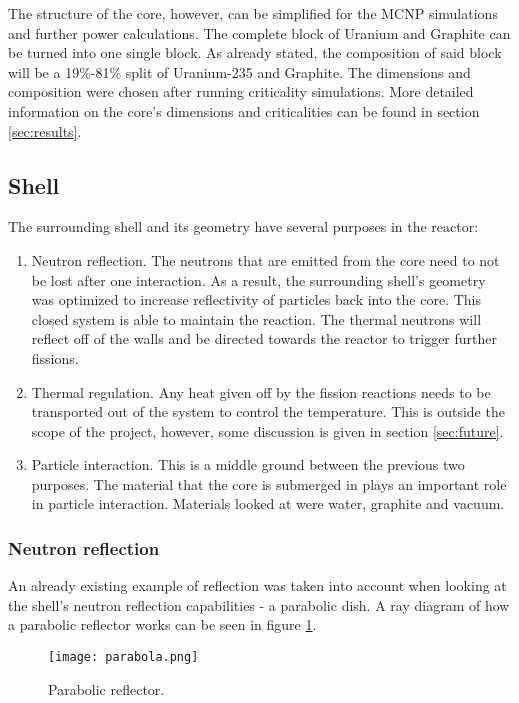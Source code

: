 The structure of the core, however, can be simplified for the MCNP simulations and further power calculations. The complete block of Uranium and Graphite can be turned into one single block. As already stated, the composition of said block will be a 19\%-81\% split of Uranium-235 and Graphite. The dimensions and composition were chosen after running criticality simulations. More detailed information on the core's dimensions and criticalities can be found in section \ref{sec:results}.

\subsection{Shell}

The surrounding shell and its geometry have several purposes in the reactor:
\begin{enumerate}
	\item Neutron reflection. The neutrons that are emitted from the core need to not be lost after one interaction. As a result, the surrounding shell's geometry was optimized to increase reflectivity of particles back into the core. This closed system is able to maintain the reaction. The thermal neutrons will reflect off of the walls and be directed towards the reactor to trigger further fissions.
	\item Thermal regulation. Any heat given off by the fission reactions needs to be transported out of the system to control the temperature. This is outside the scope of the project, however, some discussion is given in section \ref{sec:future}.
	\item Particle interaction. This is a middle ground between the previous two purposes. The material that the core is submerged in plays an important role in particle interaction. Materials looked at were water, graphite and vacuum.
\end{enumerate}

\subsubsection{Neutron reflection}

An already existing example of reflection was taken into account when looking at the shell's neutron reflection capabilities - a parabolic dish. A ray diagram of how a parabolic reflector works can be seen in figure \ref{fig:parabola}.

\begin{figure}[!htbp]
\caption{Parabolic reflector.}
\label{fig:parabola}
\centering
\texttt{[image: parabola.png]}
\end{figure}

